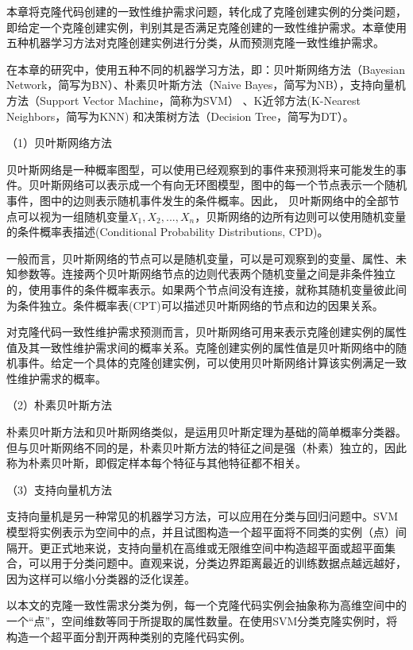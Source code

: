 本章将克隆代码创建的一致性维护需求问题，转化成了克隆创建实例的分类问题，即给定一个克隆创建实例，判别其是否满足克隆创建的一致性维护需求。本章使用五种机器学习方法对克隆创建实例进行分类，从而预测克隆一致性维护需求。

在本章的研究中，使用五种不同的机器学习方法，即：贝叶斯网络方法（Bayesian Network，简写为BN）\cite{friedman1997bayesian,pearl1985bayesian}、朴素贝叶斯方法（Naive Bayes，简写为NB）\cite{john1995estimating}，支持向量机方法（Support Vector Machine，简称为SVM）\cite{platt199912} 、K近邻方法(K-Nearest Neighbors，简写为KNN) \cite{aha1991instance}和决策树方法（Decision Tree，简写为DT）\cite{quinlan2014c4}。

（1）贝叶斯网络方法

贝叶斯网络是一种概率图型，可以使用已经观察到的事件来预测将来可能发生的事件\cite{friedman1997bayesian}。贝叶斯网络可以表示成一个有向无环图模型，图中的每一个节点表示一个随机事件，图中的边则表示随机事件发生的条件概率。因此， 贝叶斯网络中的全部节点可以视为一组随机变量{$X_{1},X_{2},...,X_{n}$}，贝斯网络的边所有边则可以使用随机变量的条件概率表描述(Conditional Probability Distributions, CPD)。

一般而言，贝叶斯网络的节点可以是随机变量，可以是可观察到的变量、属性、未知参数等。连接两个贝叶斯网络节点的边则代表两个随机变量之间是非条件独立的，使用事件的条件概率表示。如果两个节点间没有连接，就称其随机变量彼此间为条件独立。条件概率表(CPT)可以描述贝叶斯网络的节点和边的因果关系。

对克隆代码一致性维护需求预测而言，贝叶斯网络可用来表示克隆创建实例的属性值及其一致性维护需求间的概率关系。克隆创建实例的属性值是贝叶斯网络中的随机事件。给定一个具体的克隆创建实例，可以使用贝叶斯网络计算该实例满足一致性维护需求的概率。

（2）朴素贝叶斯方法

朴素贝叶斯方法和贝叶斯网络类似，是运用贝叶斯定理为基础的简单概率分类器。但与贝叶斯网络不同的是，朴素贝叶斯方法的特征之间是强（朴素）独立的，因此称为朴素贝叶斯，即假定样本每个特征与其他特征都不相关。 

（3）支持向量机方法

支持向量机是另一种常见的机器学习方法，可以应用在分类与回归问题中。SVM模型将实例表示为空间中的点，并且试图构造一个超平面将不同类的实例（点）间隔开。更正式地来说，支持向量机在高维或无限维空间中构造超平面或超平面集合，可以用于分类问题中。直观来说，分类边界距离最近的训练数据点越远越好，因为这样可以缩小分类器的泛化误差。

以本文的克隆一致性需求分类为例，每一个克隆代码实例会抽象称为高维空间中的一个“点”，空间维数等同于所提取的属性数量。在使用SVM分类克隆实例时，将构造一个超平面分割开两种类别的克隆代码实例。

